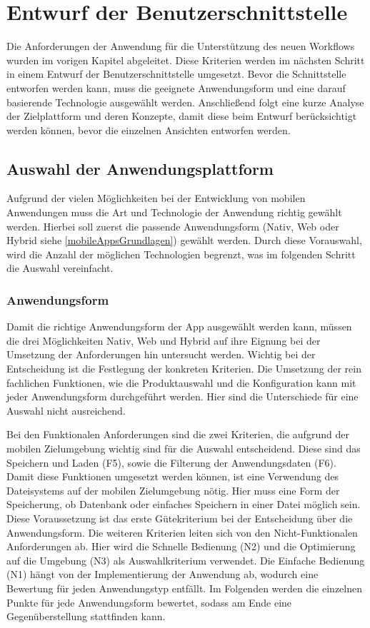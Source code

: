 \chapter{Entwurf der Benutzerschnittstelle}\label{chapter_4}
Die Anforderungen der Anwendung für die Unterstützung des neuen Workflows wurden im vorigen Kapitel abgeleitet. Diese Kriterien werden im nächsten Schritt in einem Entwurf der Benutzerschnittstelle umgesetzt. Bevor die Schnittstelle entworfen werden kann, muss die geeignete Anwendungsform und eine darauf basierende Technologie ausgewählt werden. Anschließend folgt eine kurze Analyse der Zielplattform und deren Konzepte, damit diese beim Entwurf berücksichtigt werden können, bevor die einzelnen Ansichten entworfen werden.

\section{Auswahl der Anwendungsplattform}
Aufgrund der vielen Möglichkeiten bei der Entwicklung von mobilen Anwendungen muss die Art und Technologie der Anwendung richtig gewählt werden. Hierbei soll zuerst die passende Anwendungsform (Nativ, Web oder Hybrid siehe \ref{mobileAppsGrundlagen}) gewählt werden. Durch diese Vorauswahl, wird die Anzahl der möglichen Technologien begrenzt, was im folgenden Schritt die Auswahl vereinfacht.


\subsection{Anwendungsform}
Damit die richtige Anwendungsform der App ausgewählt werden kann, müssen die drei Möglichkeiten Nativ, Web und Hybrid auf ihre Eignung bei der Umsetzung der Anforderungen hin untersucht werden. Wichtig bei der Entscheidung ist die Festlegung der konkreten Kriterien. 
Die Umsetzung der rein fachlichen Funktionen, wie die Produktauswahl und die Konfiguration kann mit jeder Anwendungsform durchgeführt werden. Hier sind die Unterschiede für eine Auswahl nicht ausreichend. \par
Bei den  Funktionalen Anforderungen sind die zwei Kriterien, die aufgrund der mobilen Zielumgebung wichtig sind für die Auswahl entscheidend. Diese sind das Speichern und Laden (F5), sowie die Filterung der Anwendungsdaten (F6). Damit diese Funktionen umgesetzt werden können, ist eine Verwendung des Dateisystems auf der mobilen Zielumgebung nötig. Hier muss eine Form der Speicherung, ob Datenbank oder einfaches Speichern in einer Datei möglich sein. Diese Voraussetzung ist das erste Gütekriterium bei der Entscheidung über die Anwendungsform. Die weiteren Kriterien leiten sich von den Nicht-Funktionalen Anforderungen ab. Hier wird die Schnelle Bedienung (N2) und die Optimierung auf die Umgebung (N3) als Auswahlkriterium verwendet. Die Einfache Bedienung (N1) hängt von der Implementierung der Anwendung ab, wodurch eine Bewertung für jeden Anwendungstyp entfällt. Im Folgenden werden die einzelnen Punkte für jede Anwendungsform bewertet, sodass am Ende eine Gegenüberstellung stattfinden kann.

